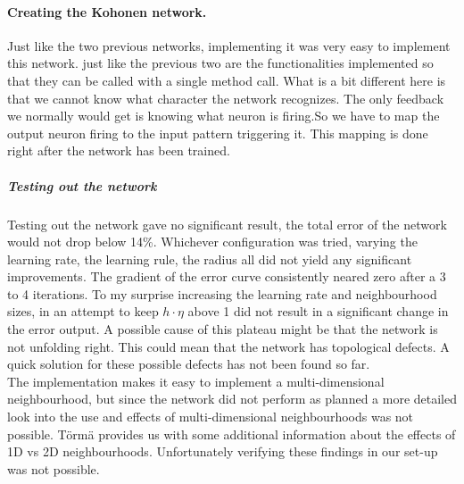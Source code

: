 \documentclass[pdftex,a4paper,12pt,twoside]{report}
\theoremstyle{plain} \newtheorem{theorem}{Theorem} \newtheorem{proposition}{Proposition} \newtheorem{lemma}{Lemma} \newtheorem*{corollary}{Corollary}
\theoremstyle{definition} \newtheorem{definition}{Definition} \newtheorem{conjecture}{Conjecture} \newtheorem*{example}{Example} \newtheorem{algorithm}{Algorithm}
\theoremstyle{remark} \newtheorem*{remark}{Remark} \newtheorem*{note}{Note} \newtheorem{case}{Case}
\begin{document}
\paragraph{Creating the Kohonen network.}
Just like the two previous networks, implementing it was very easy to implement this network. just like the previous two are the functionalities implemented so that they can be called with a single method call. What is a bit different here is that we cannot know what character the network recognizes. The only feedback we normally would get is knowing what neuron is firing.So we have to map the output neuron firing to the input pattern triggering it. This mapping is done right after the network has been trained. 
\subparagraph{Testing out the network}
Testing out the network gave no significant result, the total error of the network would not drop below 14\%. Whichever configuration was tried, varying the learning rate, the learning rule, the radius all did not yield any significant improvements. The gradient of the error curve consistently neared zero after a  3 to 4 iterations. To my surprise increasing the learning rate and neighbourhood sizes, in an attempt to keep $h \cdot \eta$ above 1 did not result in a significant change in the error output. A possible cause of this plateau might be that the network is not unfolding right. This could mean that the network has topological defects. A quick solution for these possible defects has not been found so far.\\
The implementation makes it easy to implement a multi-dimensional neighbourhood, but since the network did not perform as planned a more detailed look into the use and effects of multi-dimensional neighbourhoods was not possible. Törmä \citep{Torma1995} provides us with some additional information about the effects of 1D vs 2D neighbourhoods. Unfortunately verifying these findings in our set-up was not possible.

\cleardoublepage
\end{document}
